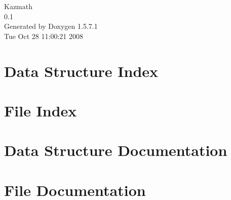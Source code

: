 \documentclass[a4paper]{book}
\begin{document}
\begin{titlepage}
\vspace*{7cm}
\begin{center}
{\Large Kazmath \\[1ex]\large 0.1 }\\
\vspace*{1cm}
{\large Generated by Doxygen 1.5.7.1}\\
\vspace*{0.5cm}
{\small Tue Oct 28 11:00:21 2008}\\
\end{center}
\end{titlepage}
\clearemptydoublepage
{}
\tableofcontents
\clearemptydoublepage
{}
\chapter{Data Structure Index}

\chapter{File Index}

\chapter{Data Structure Documentation}









\chapter{File Documentation}























\printindex
\end{document}

